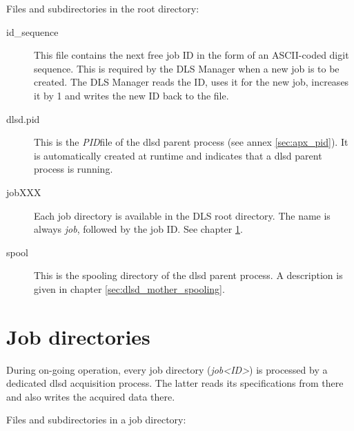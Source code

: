 \documentclass[a4paper,12pt,BCOR6mm,bibtotoc,idxtotoc]{scrbook}
\begin{document}
Files and subdirectories in the root directory:

\begin{description} 
\item[id\_sequence] This file contains the next free job ID in the form of an ASCII-coded digit sequence. This is required by the DLS Manager when a new job is to be created. The DLS Manager reads the ID, uses it for the new job, increases it by 1 and writes the new ID back to the file. 
\item[dlsd.pid] This is the \textit{PID}file of the dlsd parent process (see annex \ref{sec:apx_pid}). It is automatically created at runtime and indicates that a dlsd parent process is running. 
\item[jobXXX] Each job directory is available in the DLS root directory. The name is always \textit{job}, followed by the job ID. See chapter \ref{sec:data_jobs}. 
\item[spool] This is the spooling directory of the dlsd parent process. A description is given in chapter \ref{sec:dlsd_mother_spooling}. \end{description}


\section{Job directories} \label{sec:data_jobs}

During on-going operation, every job directory (\textit{job\textless ID\textgreater}) is processed by a dedicated dlsd acquisition process. The latter reads its specifications from there and also writes the acquired data there.

Files and subdirectories in a job directory:
\end{document}
